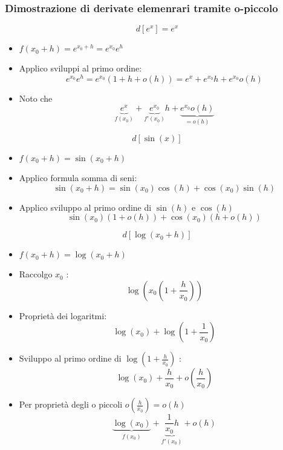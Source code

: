 \subsubsection{Dimostrazione di derivate elemenrari tramite o-piccolo}
\[
	\boxed{	d\left[ e^{x} \right] = e^{x}}
\]
\begin{itemize}
	\item $f\left( x_0 + h \right) = e^{x_0 + h}= e^{x_0 }e ^{ h}$
	\item Applico sviluppi al primo ordine:
		\[
			e^{x_0 }e ^{ h}= e^{x_0}\left( 1+h+ o\left( h \right)  \right) = e^{x}+ e^{x_0}h + e^{x_0}o\left( h \right) 
		\] 
	\item Noto che
		\[
			\underbrace{e^{x}}_{f\left( x_0 \right) }+ \underbrace{e^{x_0}}_{f'\left( x_0 \right) }h + \underbrace{e^{x_0}o\left( h \right)}_{=o\left( h \right) }
		\] 
\end{itemize}
\[
	\boxed{	d\left[ \sin \left( x \right)  \right] }
\]
\begin{itemize}
	\item $f\left( x_0 + h \right) = \sin \left( x_0 + h \right) $
	\item Applico formula somma di seni:
		\[
			\sin \left( x_0 +h \right) = \sin \left( x_0  \right) \cos \left( h \right) + \cos \left( x_0 \right) \sin \left( h \right) 
		\] 
	\item Applico sviluppo al primo ordine di $\sin \left( h \right)$ e $\cos \left( h \right) $
		\[
			\sin \left( x_0 \right) \left( 1+ o\left( h \right)  \right) + \cos \left( x_0 \right) \left( h + o \left( h \right)  \right) 
		\] 
\end{itemize}
\[
	\boxed{	d\left[ \log \left( x_0+h \right)  \right] 
}
\]
\begin{itemize}
	\item $f\left( x_0 + h \right) = \log \left( x_0 +h \right) $
	\item Raccolgo $x_0$ :
		\[
			\log \left( x_0 \left( 1+ \frac{h}{x_0} \right)  \right) 
		\] 
	\item Proprietà dei logaritmi:
		\[
			\log \left( x_0 \right) + \log \left( 1 + \frac{1}{x_0} \right) 
		\] 
	\item Sviluppo al primo ordine di $\log  \left( 1 + \frac{h}{x_0} \right) $ :
		\[
			\log \left( x_0  \right) + \frac{h}{x_0}+ o\left( \frac{h}{x_0} \right) 
		\] 
	\item Per proprietà degli o piccoli $o\left( \frac{h}{x_0} \right) = o\left( h \right) $
	\[
		\underbrace{\log \left( x_0 \right)}_{f\left( x_0 \right) } + \underbrace{\frac{1}{x_0}h}_{f'\left( x_0 \right) } + o\left( h \right) 
	\] 
\end{itemize}
